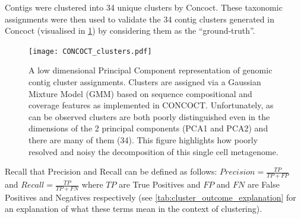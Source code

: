 Contigs were clustered into 34 unique clusters by Concoct.
These taxonomic assignments were then used to validate the 34 contig clusters 
generated in Concoct (visualised in \cref{fig:concoct_clusters}) by considering them
as the ``ground-truth''.

\begin{figure}
	\texttt{[image: CONCOCT\_clusters.pdf]}
    \caption[Genomic contig clustering]{A low dimensional Principal Component representation of genomic contig
		cluster assignments.  Clusters are assigned via a Gaussian Mixture Model (GMM) 
		based on sequence compositional and coverage features as implemented in CONCOCT.
		Unfortunately, as can be observed clusters are both poorly distinguished even
        in the dimensions of the 2 principal components (PCA1 and PCA2) and there are many of them (34).
    This figure highlights how poorly resolved and noisy the decomposition of this single cell
    metagenome.}
	\label{fig:concoct_clusters}
\end{figure}

\begin{table}
    \caption[Explanation of potential clustering errors]{A contextual explanation of True and False Positive and Negatives in the context of contig binning/clustering.  Top left indicates what a
		True Positive (TP) means in this context, bottom left a False Positive (FP).  Similarly Top Right explains a True Negative (TN) and Bottom Right a
		False Negative (FN)}
	\label{tab:cluster_outcome_explanation}
\end{table}

Recall that Precision and Recall can be defined as follows:
\( Precision = \frac{TP}{TP+FP}\) and \(Recall = \frac{TP}{TP+FN} \)
where \(TP\) are True Positives and \(FP\) and \(FN\) are False Positives
and Negatives respectively (see \cref{tab:cluster_outcome_explanation} for an 
explanation of what these terms mean in the context of clustering).

